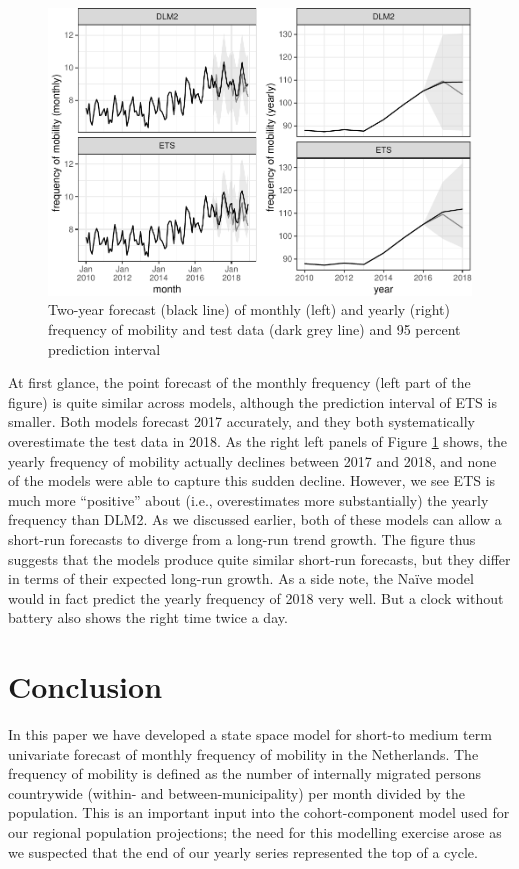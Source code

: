 \documentclass[]{article}
\begin{document}
\begin{figure}
\centering
\includegraphics{../figs/freq--forecast-2017-1.pdf}
\caption{\label{fig:forecast-2017}Two-year forecast (black line) of monthly
(left) and yearly (right) frequency of mobility and test data (dark grey
line) and 95 percent prediction interval}
\end{figure}

At first glance, the point forecast of the monthly frequency (left part
of the figure) is quite similar across models, although the prediction
interval of ETS is smaller. Both models forecast 2017 accurately, and
they both systematically overestimate the test data in 2018. As the
right left panels of Figure \ref{fig:forecast-2017} shows, the yearly
frequency of mobility actually declines between 2017 and 2018, and none
of the models were able to capture this sudden decline. However, we see
ETS is much more ``positive'' about (i.e., overestimates more
substantially) the yearly frequency than DLM2. As we discussed earlier,
both of these models can allow a short-run forecasts to diverge from a
long-run trend growth. The figure thus suggests that the models produce
quite similar short-run forecasts, but they differ in terms of their
expected long-run growth. As a side note, the Naïve model would in fact
predict the yearly frequency of 2018 very well. But a clock without
battery also shows the right time twice a day.

\section{Conclusion}\label{conclusion}

In this paper we have developed a state space model for short-to medium
term univariate forecast of monthly frequency of mobility in the
Netherlands. The frequency of mobility is defined as the number of
internally migrated persons countrywide (within- and
between-municipality) per month divided by the population. This is an
important input into the cohort-component model used for our regional
population projections; the need for this modelling exercise arose as we
suspected that the end of our yearly series represented the top of a
cycle.
\end{document}
